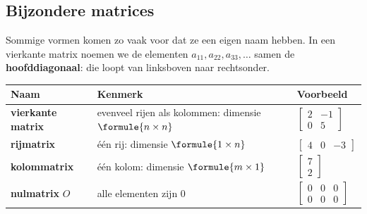 
\begin{oefeningen}
\end{oefeningen}

\subsection{Bijzondere matrices}

Sommige vormen komen zo vaak voor dat ze een eigen naam hebben. In een vierkante matrix noemen we de elementen $a_{11}, a_{22}, a_{33}, \ldots$ samen de \textbf{hoofddiagonaal}: die loopt van linksboven naar rechtsonder.

\begin{theorie}
{\centering{}\renewcommand{\arraystretch}{1.5}%
\begin{tabular}{|>{\centering\arraybackslash}m{2.8cm}|>{\centering\arraybackslash}m{5.6cm}|>{\centering\arraybackslash}m{4.4cm}|}
\hline
\textbf{Naam} & \textbf{Kenmerk} & \textbf{Voorbeeld} \\ \hline
\textbf{\textcolor{accent}{vierkante matrix}} & evenveel rijen als kolommen: dimensie $\formule{n \times n}$ & $\begin{bmatrix} 2 & -1 \\ 0 & 5 \end{bmatrix}$ \\[4mm] \hline
\textbf{\textcolor{accent}{rijmatrix}} & één rij: dimensie $\formule{1 \times n}$ & $\begin{bmatrix} 4 & 0 & -3 \end{bmatrix}$ \\[2mm] \hline
\textbf{\textcolor{accent}{kolommatrix}} & één kolom: dimensie $\formule{m \times 1}$ & $\begin{bmatrix} 7 \\ 2 \end{bmatrix}$ \\[4mm] \hline
\textbf{\textcolor{accent}{nulmatrix}} $O$ & alle elementen zijn 0 & $\begin{bmatrix} 0 & 0 & 0 \\ 0 & 0 & 0 \end{bmatrix}$ \\[4mm] \hline
\end{tabular}\par}
\end{theorie}

